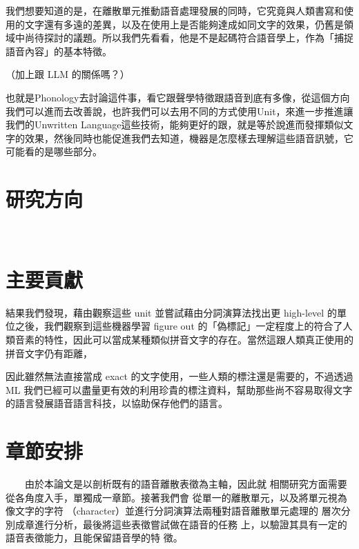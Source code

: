     我們想要知道的是，在離散單元推動語音處理發展的同時，它究竟與人類書寫和使用的文字還有多遠的差異，以及在使用上是否能夠達成如同文字的效果，仍舊是領域中尚待探討的議題。所以我們先看看，他是不是起碼符合語音學上，作為「捕捉語音內容」的基本特徵。


（加上跟 LLM 的關係嗎？）


也就是Phonology去討論這件事，看它跟聲學特徵跟語音到底有多像，從這個方向我們可以進而去改善說，也許我們可以去用不同的方式使用Unit，來進一步推進讓我們的Unwritten Language這些技術，能夠更好的跟，就是等於說進而發揮類似文字的效果，然後同時也能促進我們去知道，機器是怎麼樣去理解這些語音訊號，它可能看的是哪些部分。







\section{研究方向}
　　
\section{主要貢獻}  %

結果我們發現，藉由觀察這些 unit 並嘗試藉由分詞演算法找出更 high-level 的單位之後，我們觀察到這些機器學習 figure out 的「偽標記」一定程度上的符合了人類音素的特性，因此可以當成某種類似拼音文字的存在。當然這跟人類真正使用的拼音文字仍有距離，

因此雖然無法直接當成 exact 的文字使用，一些人類的標注還是需要的，不過透過 ML 我們已經可以盡量更有效的利用珍貴的標注資料，幫助那些尚不容易取得文字的語言發展語音語言科技，以協助保存他們的語言。


\section{章節安排}

　　由於本論文是以剖析既有的語音離散表徵為主軸，因此就
相關研究方面需要從各角度入手，單獨成一章節。接著我們會
從單一的離散單元，以及將單元視為像文字的字符
（character）並進行分詞演算法兩種對語音離散單元處理的
層次分別成章進行分析，最後將這些表徵嘗試做在語音的任務
上，以驗證其具有一定的語音表徵能力，且能保留語音學的特
徵。

